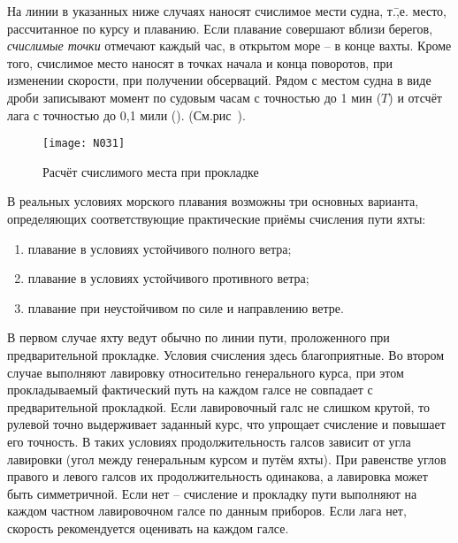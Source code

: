 На линии \IK в указанных ниже случаях наносят счислимое мести судна,
т.\=,е. место, рассчитанное по курсу и плаванию. Если плавание
совершают вблизи берегов, \textit{счислимые точки}
отмечают каждый час, в открытом море \--- в конце
вахты. Кроме того, счислимое место наносят в точках начала и конца
поворотов, при изменении скорости, при получении обсерваций. Рядом с
местом судна в виде дроби записывают момент по судовым часам с
точностью до 1 мин ($T$) и отсчёт лага с точностью до 0,1 мили
(). (См.рис~).

\begin{figure}[htb]
  \centering{}
  \texttt{[image: N031]}
  \caption{Расчёт счислимого места при прокладке}
  \label{fig:N31}
\end{figure}

В реальных условиях морского плавания возможны три основных варианта,
определяющих соответствующие практические приёмы счисления пути яхты:

\begin{enumerate}
\item плавание в условиях устойчивого полного ветра; 
\item плавание в условиях устойчивого противного ветра; 
\item плавание при неустойчивом по силе и направлению ветре. 
\end{enumerate}

В первом случае яхту ведут обычно по линии пути, проложенного при
предварительной прокладке. Условия счисления здесь благоприятные. Во
втором случае выполняют лавировку относительно генерального курса, при
этом прокладываемый фактический путь на каждом галсе не совпадает с
предварительной прокладкой. Если лавировочный галс не слишком крутой,
то рулевой точно выдерживает заданный курс, что упрощает счисление и
повышает его точность. В таких условиях продолжительность галсов
зависит от угла лавировки (угол между генеральным курсом и путём
яхты). При равенстве углов правого и левого галсов их
продолжительность одинакова, а лавировка может быть симметричной. Если
нет \--- счисление и прокладку пути выполняют на каждом частном
лавировочном галсе по данным приборов. Если лага нет, скорость
рекомендуется оценивать на каждом галсе.
 
